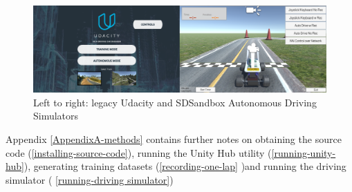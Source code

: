 \begin{figure}[h!]
\centering
\includegraphics[width=\textwidth]{Figures/UdacitySdSandboxSim.png}
\caption{Left to right: legacy Udacity and SDSandbox Autonomous Driving Simulators}
\label{fig:UdacitySdSandboxAutonomous}
\end{figure}

Appendix \ref{AppendixA-methods} contains further notes on obtaining the source code (\ref{installing-source-code}), running the Unity Hub utility (\ref{running-unity-hub}), generating training datasets (\ref{recording-one-lap} )and running the driving simulator (
\ref{running-driving simulator})






